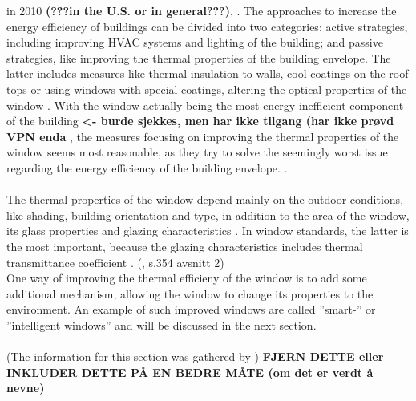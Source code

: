 in 2010
\textbf{(???in the U.S. or in general???)}.
\cite{buildingsEnergyDatabook}. 
%
The approaches to increase the energy efficiency of buildings can be divided into two 
categories: active strategies, 
including improving HVAC systems and lighting of the building; and passive strategies, like
improving the thermal properties of the building envelope. The latter includes
measures like thermal insulation to walls, cool coatings on the roof tops
or using windows with special coatings, altering the optical properties of the window 
\cite{Bojic2001,Cheung2005,Synnefa2007,Sadineni2011}.
%
With the window actually being the most energy inefficient component of the building 
\cite{Baetens2010} 
%
\textbf{<- burde sjekkes, men har ikke tilgang (har ikke prøvd VPN enda}
%
, the measures focusing on improving the thermal properties 
of the window seems most reasonable, as they try to solve the seemingly 
worst issue regarding the energy efficiency of the building envelope.
\cite{Kamalisarvestani2013}.
\\
\\
The thermal properties of the window depend mainly on
the outdoor conditions, like shading, building orientation and type, in addition to the
area of the window, its glass properties and glazing characteristics \cite{Hassouneh2010}. In window standards,
the latter is the most important, because the glazing characteristics includes thermal transmittance
coefficient \cite{Tarantini2011}.
(\cite{Kamalisarvestani2013}, s.354 avsnitt 2)\\
One way of improving the thermal efficieny of the window is to add some additional mechanism,
allowing the window to change its properties to the environment. An example of such improved 
windows are called ''smart-'' or ''intelligent windows'' and will be discussed in the next section.
\\
\\
(The information for this section was gathered by \cite{Kamalisarvestani2013}) \textbf{FJERN DETTE eller 
INKLUDER DETTE PÅ EN BEDRE MÅTE (om det er verdt å nevne) }

